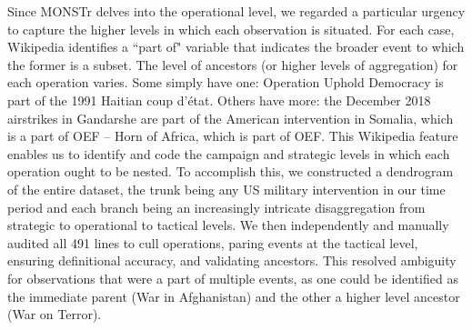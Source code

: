 \documentclass[fleqn,12pt]{article}
\begin{document}
Since MONSTr delves into the operational level, we regarded a particular urgency to capture the higher levels in which each observation is situated. For each case, Wikipedia identifies a ``part of" variable that indicates the broader event to which the former is a subset. The level of ancestors (or higher levels of aggregation) for each operation varies. Some simply have one: Operation Uphold Democracy is part of the 1991 Haitian coup d'état. Others have more: the December 2018 airstrikes in Gandarshe are part of the American intervention in Somalia, which is a part of OEF – Horn of Africa, which is part of OEF. This Wikipedia feature enables us to identify and code the campaign and strategic levels in which each operation ought to be nested. To accomplish this, we constructed a dendrogram of the entire dataset, the trunk being any US military intervention in our time period and each branch being an increasingly intricate disaggregation from strategic to operational to tactical levels. We then independently and manually audited all 491 lines to cull operations, paring events at the tactical level, ensuring definitional accuracy, and validating ancestors. This resolved ambiguity for observations that were a part of multiple events, as one could be identified as the immediate parent (War in Afghanistan) and the other a higher level ancestor (War on Terror).
\end{document}
